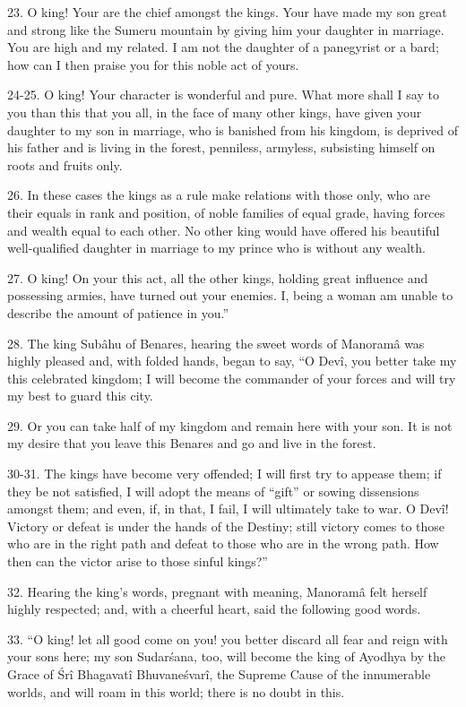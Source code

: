 23. O king! Your are the chief amongst the kings. Your have made my son great and strong like the Sumeru mountain by giving him your daughter in marriage. You are high and my related. I am not the daughter of a panegyrist or a bard; how can I then praise you for this noble act of yours.

24-25. O king! Your character is wonderful and pure. What more shall I say to you than this that you all, in the face of many other kings, have given your daughter to my son in marriage, who is banished from his kingdom, is deprived of his father and is living in the forest, penniless, armyless, subsisting himself on roots and fruits only.

26. In these cases the kings as a rule make relations with those only, who are their equals in rank and position, of noble families of equal grade, having forces and wealth equal to each other. No other king would have offered his beautiful well-qualified daughter in marriage to my prince who is without any wealth.

27. O king! On your this act, all the other kings, holding great influence and possessing armies, have turned out your enemies. I, being a woman am unable to describe the amount of patience in you.''

28. The king Sub\^ahu of Benares, hearing the sweet words of Manoram\^a was highly pleased and, with folded hands, began to say, ``O Dev\^i, you better take my this celebrated kingdom; I will become the commander of your forces and will try my best to guard this city.

29. Or you can take half of my kingdom and remain here with your son. It is not my desire that you leave this Benares and go and live in the forest.

30-31. The kings have become very offended; I will first try to appease them; if they be not satisfied, I will adopt the means of ``gift'' or sowing dissensions amongst them; and even, if, in that, I fail, I will ultimately take to war. O Dev\^i! Victory or defeat is under the hands of the Destiny; still victory comes to those who are in the right path and defeat to those who are in the wrong path. How then can the victor arise to those sinful kings?''

32. Hearing the king's words, pregnant with meaning, Manoram\^a felt herself highly respected; and, with a cheerful heart, said the following good words.

33. ``O king! let all good come on you! you better discard all fear and reign with your sons here; my son Sudar\'sana, too, will become the king of Ayodhya by the Grace of \'Sr\^i Bhagavat\^i Bhuvane\'svar\^i, the Supreme Cause of the innumerable worlds, and will roam in this world; there is no doubt in this.

